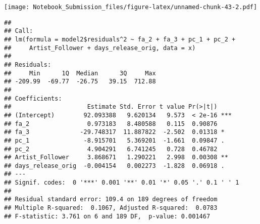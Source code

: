 \documentclass[
]{article}
\newenvironment{Shaded}{\begin{snugshade}}{\end{snugshade}}
\newcommand{\CommentTok}[1]{\textcolor[rgb]{0.56,0.35,0.01}{\textit{#1}}}
\newcommand{\DataTypeTok}[1]{\textcolor[rgb]{0.13,0.29,0.53}{#1}}
\newcommand{\DecValTok}[1]{\textcolor[rgb]{0.00,0.00,0.81}{#1}}
\newcommand{\KeywordTok}[1]{\textcolor[rgb]{0.13,0.29,0.53}{\textbf{#1}}}
\newcommand{\NormalTok}[1]{#1}
\newcommand{\OperatorTok}[1]{\textcolor[rgb]{0.81,0.36,0.00}{\textbf{#1}}}
\newcommand{\StringTok}[1]{\textcolor[rgb]{0.31,0.60,0.02}{#1}}
\begin{document}
\texttt{[image: Notebook\_Submission\_files/figure-latex/unnamed-chunk-43-2.pdf]}

\begin{Shaded}
\end{Shaded}

\begin{verbatim}
## 
## Call:
## lm(formula = model2$residuals^2 ~ fa_2 + fa_3 + pc_1 + pc_2 + 
##     Artist_Follower + days_release_orig, data = x)
## 
## Residuals:
##     Min      1Q  Median      3Q     Max 
## -209.99  -69.77  -26.75   39.15  712.88 
## 
## Coefficients:
##                     Estimate Std. Error t value Pr(>|t|)    
## (Intercept)        92.093388   9.620134   9.573  < 2e-16 ***
## fa_2                0.973183   8.480588   0.115  0.90876    
## fa_3              -29.748317  11.887822  -2.502  0.01318 *  
## pc_1               -8.915701   5.369201  -1.661  0.09847 .  
## pc_2                4.904291   6.741245   0.728  0.46782    
## Artist_Follower     3.868671   1.290221   2.998  0.00308 ** 
## days_release_orig  -0.004154   0.002273  -1.828  0.06918 .  
## ---
## Signif. codes:  0 '***' 0.001 '**' 0.01 '*' 0.05 '.' 0.1 ' ' 1
## 
## Residual standard error: 109.4 on 189 degrees of freedom
## Multiple R-squared:  0.1067, Adjusted R-squared:  0.0783 
## F-statistic: 3.761 on 6 and 189 DF,  p-value: 0.001467
\end{verbatim}

\begin{Shaded}
\end{Shaded}
\end{document}
